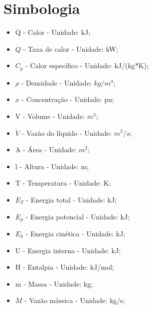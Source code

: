 \documentclass[
	12pt,				%
	openright,			%
	oneside,			%
	a4paper,			%
	english,			%
	french,				%
	spanish,			%
	brazil				%
	]{abntex2}
\begin{document}
\newpage
\chapter{Simbologia}
\pagestyle{fancy}

\begin{itemize}
\item Q - Calor - Unidade: kJ;
\item $\dot{Q}$ - Taxa de calor - Unidade: kW;
\item $C_{p}$ - Calor específico - Unidade: kJ/(kg*K);
\item $\rho$ - Densidade - Unidade: $kg/m^{3}$;
\item $x$ - Concentração - Unidade: pu;
\item V - Volume - Unidade: $m^{3}$;
\item $\dot{V}$ - Vazão do líquido - Unidade: $m^{3}/s$;
\item A - Área - Unidade: $m^{2}$;
\item l - Altura - Unidade: m;
\item T - Temperatura - Unidade: K;
\item $E_{T}$ - Energia total - Unidade: kJ;
\item $E_{p}$ - Energia potencial - Unidade: kJ;
\item $E_{k}$ - Energia cinética - Unidade: kJ;
\item U - Energia interna - Unidade: kJ;
\item H - Entalpia - Unidade: kJ/mol;
\item m - Massa - Unidade: kg;
\item $\dot{M}$ - Vazão mássica - Unidade: kg/s;
\end{itemize}

\newpage
\postextual


\end{document}
